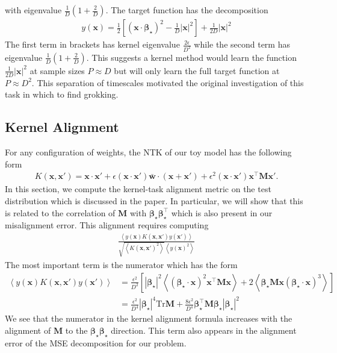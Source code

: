 \documentclass{article} %
\def\w{\bm w}
\def\x{\bm x}
\def\M{\bm M}
\begin{document}
with eigenvalue $\frac{1}{D} (1 + \frac{2}{D})$. The target function has the decomposition
\begin{align}
    y(\x) = \frac{1}{2} \left[ (\x \cdot \bm\beta_\star)^2 - \frac{1}{D} |\x|^2 \right]  + \frac{1}{2D} |\x|^2 
\end{align}
The first term in brackets has kernel eigenvalue $\frac{2\epsilon}{D^2}$ while the second term has eigenvalue $\frac{1}{D} (1 + \frac{2}{D})$. This suggests a kernel method would learn the function $\frac{1}{2D} |\x|^2$ at sample sizes $P \approx D$ but will only learn the full target function at $P \approx D^2$. This separation of timescales motivated the original investigation of this task in which to find grokking. 

\subsection{Kernel Alignment}

For any configuration of weights, the NTK of our toy model has the following form
\begin{align}
    K(\x,\x') = \x \cdot \x' + \epsilon (\x\cdot\x') \bar{\w} \cdot (\x + \x') + \epsilon^2 (\x\cdot \x') \x^\top \M \x' . 
\end{align}
In this section, we compute the kernel-task alignment metric on the test distribution which is discussed in the paper. In particular, we will show that this is related to the correlation of $\M$ with $\bm\beta_\star \bm\beta_\star^\top$ which is also present in our misalignment error. This alignment requires computing 
\begin{align}
    \frac{\left<  y(\x) K(\x,\x') y(\x') \right>}{\sqrt{ \left< K(\x,\x')^2 \right>} \left< y(\x)^2 \right>}
\end{align}
The most important term is the numerator which has the form
\begin{align}
    \left< y(\x) K(\x,\x') y(\x') \right> &= 
     \frac{\epsilon^2}{D^2} \left[ |\bm\beta_\star|^2 \left< (\bm\beta_\star \cdot \x)^2 \x^\top \M \x \right> + 2 \left< \bm\beta_\star \M \x  (\bm\beta_\star \cdot \x)^3 \right> \right] \nonumber
     \\
     &=  \frac{\epsilon^2}{D^4} |\bm\beta_\star|^4   \text{Tr} \M  + \frac{8\epsilon^2}{D^4} \bm\beta_\star^\top \M \bm\beta_\star  |\bm\beta_\star|^2 
\end{align}
We see that the numerator in the kernel alignment formula increases with the alignment of $\M$ to the $\bm\beta_\star \bm\beta_\star$ direction. This term also appears in the alignment error of the MSE decomposition for our problem.  
\end{document}
